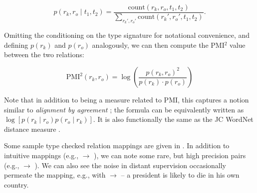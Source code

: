 \vspace{0.25cm}
\begin{equation*}
  p(r_k, r_o \mid t_1, t_2) = \frac{
    \textrm{count}(r_k, r_o,  t_1, t_2)
  }{
    \sum_{r_k', r_o'}\textrm{count}(r_k', r_o', t_1, t_2)
  }.
\end{equation*}
\vspace{0.25cm}

Omitting the conditioning on the type signature for notational convenience,
  and defining $p(r_k)$ and $p(r_o)$ analogously,
  we can then compute the PMI$^2$ value between the two relations:

\vspace{0.25cm}
\begin{equation*}
  \textrm{PMI}^2(r_k, r_o) = \log \left( \frac{p(r_k, r_o)^2}{p(r_k) \cdot p(r_o)} \right)
\end{equation*}
\vspace{0.25cm}

Note that in addition to being a measure related to PMI, this captures
  a notion similar to \textit{alignment by agreement} 
  \cite{key:2006liang-alignment};
  the formula can be equivalently written as 
  $\log \left[ p(r_k \mid r_o) p(r_o \mid r_k)\right]$.
It is also functionally the same as the JC WordNet distance measure
  \cite{key:1997jc-similarity}.

Some sample type checked relation mappings are given in .
In addition to intuitive mappings (e.g.,  $\rightarrow$ 
  ), we can note some rare, but high precision pairs
  (e.g.,  $\rightarrow$ ).
We can also see the noise in distant supervision occasionally permeate 
  the mapping, e.g., with  $\rightarrow$ 
  -- a president is likely to die in his own country.


  


